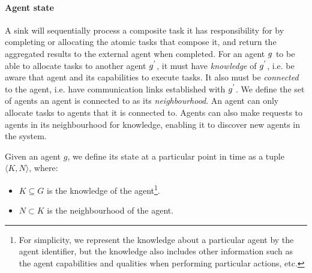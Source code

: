 \paragraph{Agent state}

 A sink will sequentially process a composite task it has responsibility for by completing or allocating the atomic tasks that compose it, and return the aggregated results to the external agent when completed. For an agent $g_{}^{}$ to be able to allocate tasks to another agent $g_{}^{'}$, it must have \textit{knowledge} of $g_{}^{'}$, i.e. be aware that agent and its capabilities to execute tasks. It also must be \textit{connected} to the agent, i.e. have communication links established with $g_{}^{'}$. We define the set of agents an agent is connected to as its \textit{neighbourhood}. An agent can only allocate tasks to agents that it is connected to. Agents can also make requests to agents in its neighbourhood for knowledge, enabling it to discover new agents in the system.
 
\begin{definition}
	\label{def:agent-state}
	Given an agent $g$, we define its state at a particular point in time as a tuple $\langle K, N\rangle$, where:
	\begin{itemize}
		\item $K\subseteq G$ is the knowledge of the agent\footnote{For simplicity, we represent the knowledge about a particular agent by the agent identifier, but the knowledge also includes other information such as the agent capabilities and qualities when performing particular actions, etc. }.
		\item $N\subset K$ is the neighbourhood of the agent.
	\end{itemize}
\end{definition}

